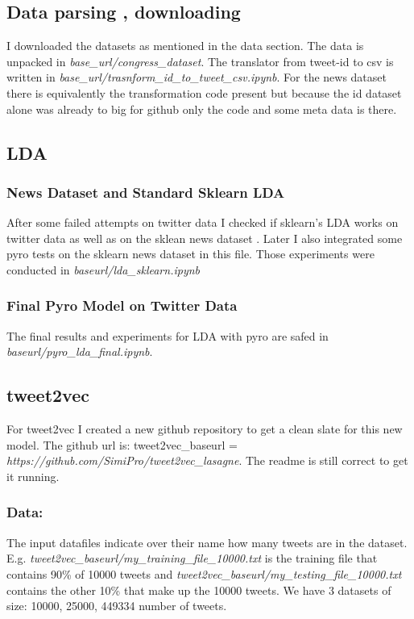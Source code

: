 \documentclass[10pt,conference,compsocconf]{IEEEtran}
\begin{document}
\subsection{Data parsing , downloading}
I downloaded the datasets as mentioned in the data section. The data is unpacked in \textit{base\_url/congress\_dataset}. The translator from tweet-id to csv is written in \textit{base\_url/trasnform\_id\_to\_tweet\_csv.ipynb}. For the news dataset there is equivalently the transformation code present but because the id dataset alone was already to big for github only the code and some meta data is there. 

\subsection{LDA}
\subsubsection{News Dataset and Standard Sklearn LDA}
After some failed attempts on twitter data I checked if sklearn's LDA works on twitter data as well as on the sklean news dataset \cite{sklearn_newsdataset}. Later I also integrated some pyro tests on the sklearn news dataset in this file. Those experiments were conducted in \textit{baseurl/lda\_sklearn.ipynb}
\subsubsection{Final Pyro Model on Twitter Data}
The final results and experiments for LDA with pyro are safed in \textit{baseurl/pyro\_lda\_final.ipynb}.

\subsection{tweet2vec}
For tweet2vec I created a new github repository to get a clean slate for this new model. The github url is: tweet2vec\_baseurl = \textit{https://github.com/SimiPro/tweet2vec\_lasagne}. The readme is still correct to get it running.
\subsubsection{Data:}
 The input datafiles indicate over their name how many tweets are in the dataset. E.g. \textit{tweet2vec\_baseurl/my\_training\_file\_10000.txt} is the training file that contains 90\% of 10000 tweets and \textit{tweet2vec\_baseurl/my\_testing\_file\_10000.txt} contains the other 10\% that make up the 10000 tweets. We have 3 datasets of size: 10000, 25000, 449334 number of tweets. 
\end{document}
